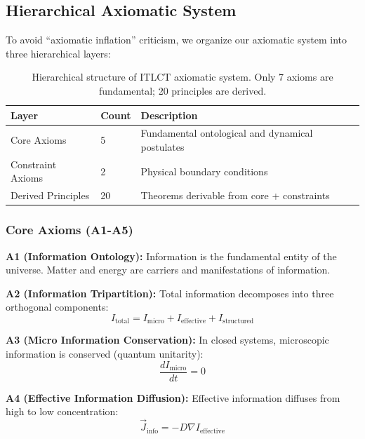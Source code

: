 \documentclass[12pt,a4paper]{article}
\begin{document}
\subsection{Hierarchical Axiomatic System}

To avoid ``axiomatic inflation'' criticism, we organize our axiomatic system into three hierarchical layers:

\begin{table}[h]
\centering
\begin{tabular}{@{}lll@{}}
\toprule
\textbf{Layer} & \textbf{Count} & \textbf{Description} \\
\midrule
Core Axioms & 5 & Fundamental ontological and dynamical postulates \\
Constraint Axioms & 2 & Physical boundary conditions \\
Derived Principles & 20 & Theorems derivable from core + constraints \\
\bottomrule
\end{tabular}
\caption{Hierarchical structure of ITLCT axiomatic system. Only 7 axioms are fundamental; 20 principles are derived.}
\end{table}

\subsubsection{Core Axioms (A1-A5)}

\textbf{A1 (Information Ontology):} Information is the fundamental entity of the universe. Matter and energy are carriers and manifestations of information.

\textbf{A2 (Information Tripartition):} Total information decomposes into three orthogonal components:
\begin{equation}
I_{\text{total}} = I_{\text{micro}} + I_{\text{effective}} + I_{\text{structured}}
\end{equation}

\textbf{A3 (Micro Information Conservation):} In closed systems, microscopic information is conserved (quantum unitarity):
\begin{equation}
\frac{dI_{\text{micro}}}{dt} = 0
\end{equation}

\textbf{A4 (Effective Information Diffusion):} Effective information diffuses from high to low concentration:
\begin{equation}
\vec{J}_{\text{info}} = -D \nabla I_{\text{effective}}
\end{equation}
\end{document}
